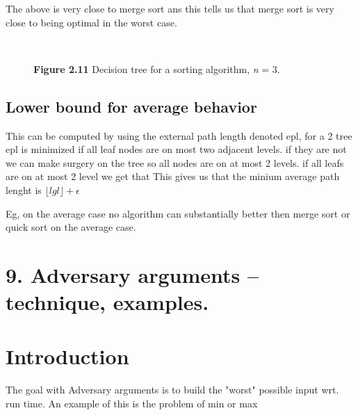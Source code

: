 \documentclass[a4paper,10pt,titlepage]{report}
\begin{document}
The above is very close to merge sort ans this tells us that merge sort is very close to being optimal in the worst case.

    
\begin{figure}[h]
\\
\caption{\textbf{Figure 2.11} Decision tree for a sorting algorithm, \textit{n} = 3.}
\end{figure}


\subsection{Lower bound for average behavior}

This can be computed by using the external path length denoted epl, for a 2 tree epl is minimized if all leaf nodes are on most two adjacent levels. if they are not we can make surgery on the tree so all nodes are on at most 2 levels. if all leafs are on at most 2 level we get that This gives us that the minium average path lenght is $\lfloor lg l \rfloor + \epsilon$

Eg, on the average case no algorithm can substantially better then merge sort or quick sort on the average case.\\





\newpage
\section{9. Adversary arguments – technique, examples.}

\section{Introduction}
The goal with Adversary arguments is to build the "worst" possible input wrt. run time. An example of this is the problem of min or max\\
\end{document}
